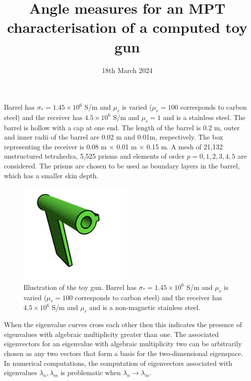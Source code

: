 \documentclass[a4paper,12]{article}
\theoremstyle{definition}
\begin{document}
\title{Angle measures for an MPT characterisation of a computed toy gun}
\date{18th March 2024}
\maketitle

Barrel has $\sigma_* = 1.45\times 10^6$ S/m and $\mu_r$ is varied ($\mu_r=100$ corresponds to carbon steel) and the receiver has $4.5 \times 10^6$ S/m and $\mu_r=1$ and is a stainless steel.  The barrel is hollow with a cap at one end.  The length of the barrel is 0.2 m, outer and inner radii of the barrel are 0.02 m and 0.01m, respectively. The box representing the receiver is 0.08 m $\times$ 0.01 m $\times$ 0.15 m.  A mesh of 21,132 unstructured tetrahedra, 5,525 prisms and elements of order $p=0,1,2,3,4,5$ are considered. The prisms are chosen to be used as boundary layers in the barrel, which has a smaller skin depth. 

\begin{figure}[h]
\begin{center}
\includegraphics[width=0.5\textwidth]{Gun_modelv2_nonsym_StainSt.png}
\end{center}
\caption{Illustration of the toy gun. Barrel has $\sigma_* = 1.45\times 10^6$ S/m and $\mu_r$ is varied ($\mu_r=100$ corresponds to carbon steel) and the receiver has $4.5 \times 10^6$ S/m and $\mu_r$ and is a non-magnetic stainless steel.}
\end{figure}

When the eigenvalue curves  cross each other then this indicates the presence of eigenvalues with algebraic multiplicity greater than one.  The associated eigenvectors for an eigenvalue with algebraic multiplicity two 
 can be arbitrarily chosen as any two vectors that form a basis for the two-dimensional eigenspace.  In numerical computations, the computation of eigenvectors associated with eigenvalues $\lambda_n , \lambda_m$ is problematic when $\lambda_n \to \lambda_m$. 
\end{document}
